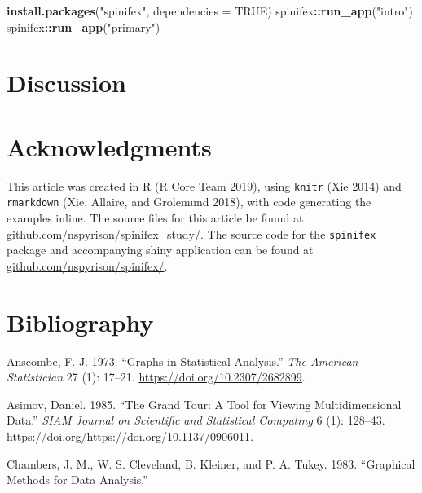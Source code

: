 \documentclass[
]{article}
\newenvironment{Shaded}{\begin{snugshade}}{\end{snugshade}}
\newcommand{\DataTypeTok}[1]{\textcolor[rgb]{0.13,0.29,0.53}{#1}}
\newcommand{\KeywordTok}[1]{\textcolor[rgb]{0.13,0.29,0.53}{\textbf{#1}}}
\newcommand{\NormalTok}[1]{#1}
\newcommand{\OperatorTok}[1]{\textcolor[rgb]{0.81,0.36,0.00}{\textbf{#1}}}
\newcommand{\OtherTok}[1]{\textcolor[rgb]{0.56,0.35,0.01}{#1}}
\newcommand{\StringTok}[1]{\textcolor[rgb]{0.31,0.60,0.02}{#1}}
\begin{document}
\begin{Shaded}
\begin{Highlighting}[]
\KeywordTok{install.packages}\NormalTok{(}\StringTok{"spinifex"}\NormalTok{, }\DataTypeTok{dependencies =} \OtherTok{TRUE}\NormalTok{)}
\NormalTok{spinifex}\OperatorTok{::}\KeywordTok{run_app}\NormalTok{(}\StringTok{"intro"}\NormalTok{)}
\NormalTok{spinifex}\OperatorTok{::}\KeywordTok{run_app}\NormalTok{(}\StringTok{"primary"}\NormalTok{)}
\end{Highlighting}
\end{Shaded}

\hypertarget{sec:discussion}{%
\section{Discussion}\label{sec:discussion}}

\hypertarget{sec:acknowledgments}{%
\section{Acknowledgments}\label{sec:acknowledgments}}

This article was created in R (R Core Team 2019), using \texttt{knitr}
(Xie 2014) and \texttt{rmarkdown} (Xie, Allaire, and Grolemund 2018),
with code generating the examples inline. The source files for this
article be found at
\href{https://github.com/nspyrison/spinifex_paper/}{github.com/nspyrison/spinifex\_study/}.
The source code for the \texttt{spinifex} package and accompanying shiny
application can be found at
\href{https://github.com/nspyrison/spinifex/}{github.com/nspyrison/spinifex/}.

\hypertarget{sec:bib}{%
\section*{Bibliography}\label{sec:bib}}

\hypertarget{refs}{}
\leavevmode\hypertarget{ref-anscombe_graphs_1973}{}%
Anscombe, F. J. 1973. ``Graphs in Statistical Analysis.'' \emph{The
American Statistician} 27 (1): 17--21.
\url{https://doi.org/10.2307/2682899}.

\leavevmode\hypertarget{ref-asimov_grand_1985}{}%
Asimov, Daniel. 1985. ``The Grand Tour: A Tool for Viewing
Multidimensional Data.'' \emph{SIAM Journal on Scientific and
Statistical Computing} 6 (1): 128--43.
\url{https://doi.org/https://doi.org/10.1137/0906011}.

\leavevmode\hypertarget{ref-chambers_graphical_1983}{}%
Chambers, J. M., W. S. Cleveland, B. Kleiner, and P. A. Tukey. 1983.
``Graphical Methods for Data Analysis.''
\end{document}
